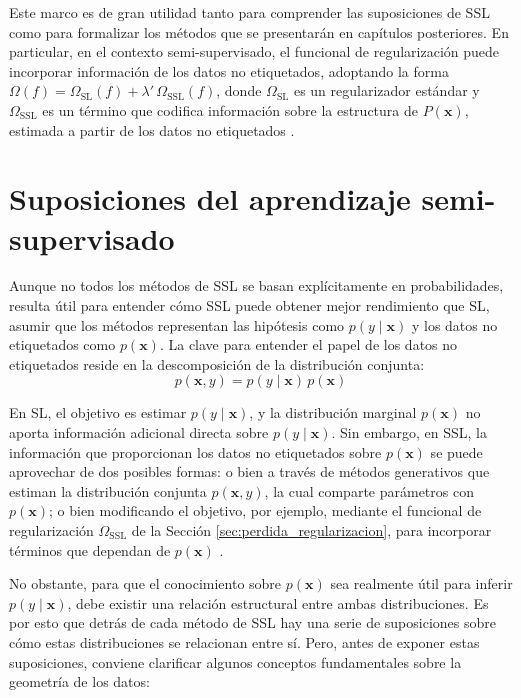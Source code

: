 Este marco es de gran utilidad tanto para comprender las suposiciones de \gls{SSL} como para formalizar los métodos que se presentarán en capítulos posteriores. En particular, en el contexto semi-supervisado, el funcional de regularización puede incorporar información de los datos no etiquetados, adoptando la forma $\Omega(f) = \Omega_{\text{SL}}(f) + \lambda'\, \Omega_{\text{SSL}}(f)$, donde $\Omega_{\text{SL}}$ es un regularizador estándar y $\Omega_{\text{SSL}}$ es un término que codifica información sobre la estructura de $P(\mathbf{x})$, estimada a partir de los datos no etiquetados \cite{zhu2009introduction}.

\section{Suposiciones del aprendizaje semi-supervisado}
\label{sec:suposiciones}

Aunque no todos los métodos de \gls{SSL} se basan explícitamente en probabilidades, resulta útil para entender cómo \gls{SSL} puede obtener mejor rendimiento que \gls{SL}, asumir que los métodos representan las hipótesis como $p(y \mid \mathbf{x})$ y los datos no etiquetados como $p(\mathbf{x})$. La clave para entender el papel de los datos no etiquetados reside en la descomposición de la distribución conjunta:
$$p(\mathbf{x}, y) = p(y \mid \mathbf{x})\, p(\mathbf{x})$$

En \gls{SL}, el objetivo es estimar $p(y \mid \mathbf{x})$, y la distribución marginal $p(\mathbf{x})$ no aporta información adicional directa sobre $p(y \mid \mathbf{x})$. Sin embargo, en \gls{SSL}, la información que proporcionan los datos no etiquetados sobre $p(\mathbf{x})$ se puede aprovechar de dos posibles formas: o bien a través de métodos generativos que estiman la distribución conjunta $p(\mathbf{x},y)$, la cual comparte parámetros con $p(\mathbf{x})$; o bien modificando el objetivo, por ejemplo, mediante el funcional de regularización $\Omega_{\text{SSL}}$ de la Sección \ref{sec:perdida_regularizacion}, para incorporar términos que dependan de $p(\mathbf{x})$ \cite{zhu2005semi}.

No obstante, para que el conocimiento sobre $p(\mathbf{x})$ sea realmente útil para inferir $p(y \mid \mathbf{x})$, debe existir una relación estructural entre ambas distribuciones. Es por esto que detrás de cada método de \gls{SSL} hay una serie de suposiciones sobre cómo estas distribuciones se relacionan entre sí. Pero, antes de exponer estas suposiciones, conviene clarificar algunos conceptos fundamentales sobre la geometría de los datos:

